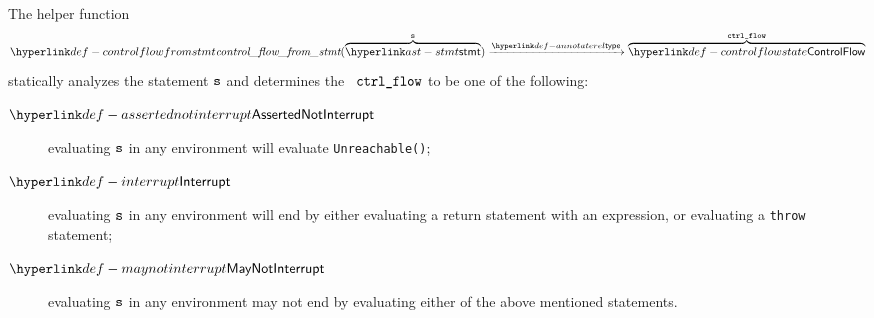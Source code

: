 \hypertarget{def-controlflowfromstmt}{}
The helper function
\[
  \controlflowfromstmt(\overname{\stmt}{\vs})
  \typearrow \overname{\controlflowstate}{\vctrlflow}
\]
statically analyzes the statement $\texttt{s}$
and determines the \controlflowsymbolterm\ $\texttt{ctrl\_flow}$ to be one of the following:
\hypertarget{def-assertednotinterrupt}{}
\begin{description}
  \item[$\assertednotinterrupt$] evaluating $\texttt{s}$ in any environment will evaluate \texttt{Unreachable()};
  \hypertarget{def-interrupt}{}
  \item[$\interrupt$] evaluating $\texttt{s}$ in any environment will end by either evaluating a return statement with an expression,
      or evaluating a \texttt{throw} statement;
  \hypertarget{def-maynotinterrupt}{}
  \item[$\maynotinterrupt$] evaluating $\texttt{s}$ in any environment may not end by evaluating either of the above mentioned statements.
\end{description}

